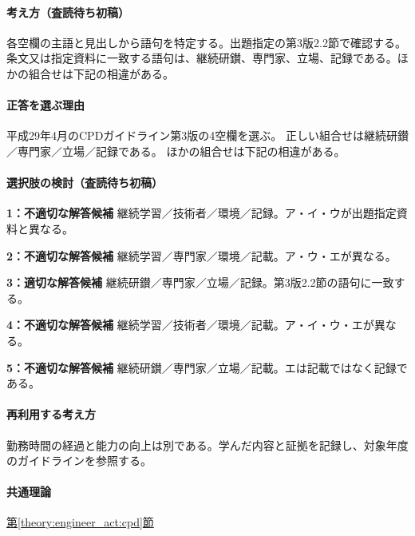 \paragraph{考え方（査読待ち初稿）} 各空欄の主語と見出しから語句を特定する。出題指定の第3版2.2節で確認する。 条文又は指定資料に一致する語句は、継続研鑚、専門家、立場、記録である。ほかの組合せは下記の相違がある。

\paragraph{正答を選ぶ理由} 平成29年4月のCPDガイドライン第3版の4空欄を選ぶ。 正しい組合せは継続研鑚／専門家／立場／記録である。 ほかの組合せは下記の相違がある。

\paragraph{選択肢の検討（査読待ち初稿）}\mbox{}\par

\noindent\textbf{1：不適切な解答候補} 継続学習／技術者／環境／記録。ア・イ・ウが出題指定資料と異なる。\par

\noindent\textbf{2：不適切な解答候補} 継続学習／専門家／環境／記載。ア・ウ・エが異なる。\par

\noindent\textbf{3：適切な解答候補} 継続研鑚／専門家／立場／記録。第3版2.2節の語句に一致する。\par

\noindent\textbf{4：不適切な解答候補} 継続学習／技術者／環境／記載。ア・イ・ウ・エが異なる。\par

\noindent\textbf{5：不適切な解答候補} 継続研鑚／専門家／立場／記載。エは記載ではなく記録である。\par

\paragraph{再利用する考え方} 勤務時間の経過と能力の向上は別である。学んだ内容と証拠を記録し、対象年度のガイドラインを参照する。

\paragraph{共通理論} \hyperref[theory:engineer_act:cpd]{第\ref*{theory:engineer_act:cpd}節}

